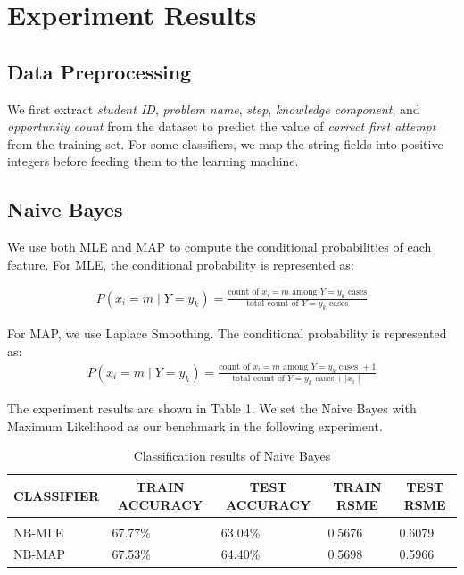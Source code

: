 \documentclass{article} %
\begin{document}
\section{Experiment Results}
\label{others}
 
\subsection{Data Preprocessing}
 We first extract \emph{student ID}, \emph{problem name}, \emph{step}, \emph{knowledge component}, and \emph{opportunity count} from the dataset to predict the value of \emph{correct first attempt} from the training set. For some classifiers, we map the string fields into positive integers before feeding them to the learning machine.
 
\subsection{Naive Bayes}
We use both MLE and MAP to compute the conditional probabilities of each feature. For MLE, the conditional probability is represented as:

\begin{equation}
\begin{aligned}
P(x_i=m\mid Y=y_k)=\frac{\mbox{count of }x_i=m \mbox{ among } Y=y_k \mbox{ cases}}{\mbox{total count of } Y=y_k \mbox{ cases}}
\end{aligned}
\end{equation}


For MAP, we use Laplace Smoothing. The conditional probability is represented as:
\begin{equation}
\begin{aligned}
P(x_i=m\mid Y=y_k)=\frac{\mbox{count of }x_i=m \mbox{ among } Y=y_k \mbox{ cases }+ 1}{\mbox{total count of } Y=y_k \mbox{ cases} + \mid x_i\mid}
\end{aligned}
\end{equation}


The experiment results are shown in Table 1. We set the Naive Bayes with Maximum Likelihood as our benchmark in the following experiment.

\begin{table}[h]
\caption{Classification results of Naive Bayes}
\label{sample-table}
\begin{center}
\begin{tabular}{lllll}
\multicolumn{1}{c}{\bf CLASSIFIER}  &\multicolumn{1}{c}{\bf TRAIN ACCURACY}  &\multicolumn{1}{c}{\bf TEST ACCURACY} &\multicolumn{1}{c}{\bf TRAIN RSME} &\multicolumn{1}{c}{\bf TEST RSME}
\\ \hline \\
NB-MLE     &67.77\%  &63.04\% &0.5676 &0.6079\\
NB-MAP     &67.53\%  &64.40\% &0.5698 &0.5966\\
\end{tabular}
\end{center}
\end{table}
\end{document}
